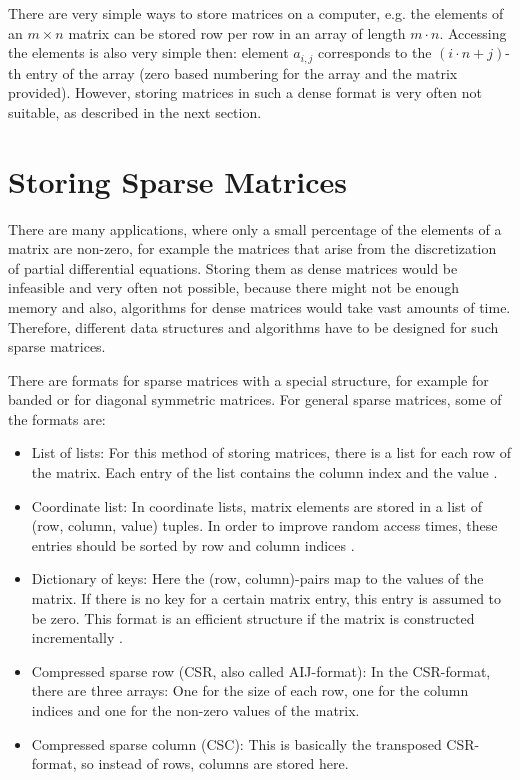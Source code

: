 There are very simple ways to store matrices on a computer, e.g. the elements of an $m\times n$ matrix can be stored row per row in an array of length $m\cdot n$. Accessing the elements is also very simple then: element $a_{i,j}$ corresponds to the $(i\cdot n + j)$-th entry of the array (zero based numbering for the array and the matrix provided). However, storing matrices in such a dense format is very often not suitable, as described in the next section. 

\section{Storing Sparse Matrices}
There are many applications, where only a small percentage of the elements of a matrix are non-zero, for example the matrices that arise from the discretization of partial differential equations. Storing them as dense matrices would be infeasible and very often not possible, because there might not be enough memory and also, algorithms for dense matrices would take vast amounts of time. Therefore, different data structures and algorithms have to be designed for such sparse matrices. 

There are formats for sparse matrices with a special structure, for example for banded or for diagonal symmetric matrices. For general sparse matrices, some of the formats are:

\begin{itemize}
\item List of lists: For this method of storing matrices, there is a list for each row of the matrix. Each entry of the list contains the column index and the value \cite{python}.
\item Coordinate list: In coordinate lists, matrix elements are stored in a list of (row, column, value) tuples. In order to improve random access times, these entries should be sorted by row and column indices \cite{python}.
\item Dictionary of keys: Here the (row, column)-pairs map to the values of the matrix. If there is no key for a certain matrix entry, this entry is assumed to be zero. This format is an efficient structure if the matrix is constructed incrementally \cite{python}.
\item Compressed sparse row (CSR, also called AIJ-format): In the CSR-format, there are three arrays: One for the size of each row, one for the column indices and one for the non-zero values of the matrix.
\item Compressed sparse column (CSC): This is basically the transposed CSR-format, so instead of rows, columns are stored here. 
\end{itemize}

